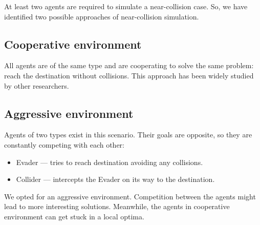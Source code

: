 
At least two agents are required to simulate a near-collision case.
So, we have identified two possible approaches of near-collision simulation.

\subsection{Cooperative environment}\label{subsec:cooperative-environment}
All agents are of the same type and are cooperating to solve the same problem: reach the destination without collisions.
This approach has been widely studied by other researchers.

\subsection{Aggressive environment}\label{subsec:agressive-environment}
Agents of two types exist in this scenario.
Their goals are opposite, so they are constantly competing with each other:
\begin{itemize}
	\item Evader — tries to reach destination avoiding any collisions.
	\item Collider — intercepts the Evader on its way to the destination.
\end{itemize}

We opted for an aggressive environment.
Competition between the agents might lead to more interesting solutions.
Meanwhile, the agents in cooperative environment can get stuck in a local optima.
